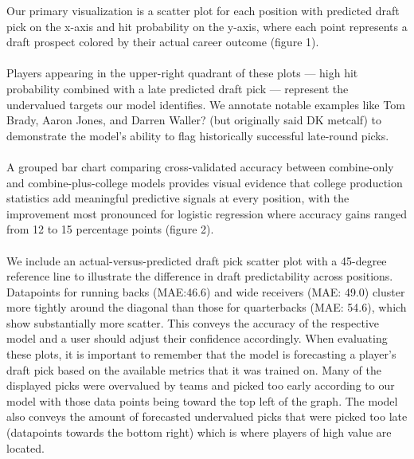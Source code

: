 \documentclass[11pt]{article}
\begin{document}
Our primary visualization is a scatter plot for each position with predicted draft pick on the x-axis and hit probability on the y-axis, where each point represents a draft prospect colored by their actual career outcome (figure 1). \\
\\
Players appearing in the upper-right quadrant of these plots — high hit probability combined with a late predicted draft pick — represent the undervalued targets our model identifies. We annotate notable examples like Tom Brady, Aaron Jones, and Darren Waller? (but originally said DK metcalf) to demonstrate the model's ability to flag historically successful late-round picks. \\
\\
A grouped bar chart comparing cross-validated accuracy between combine-only and combine-plus-college models provides visual evidence that college production statistics add meaningful predictive signals at every position, with the improvement most pronounced for logistic regression where accuracy gains ranged from 12 to 15 percentage points (figure 2). \\
\\
We include an actual-versus-predicted draft pick scatter plot with a 45-degree reference line to illustrate the difference in draft predictability across positions. Datapoints for running backs (MAE:46.6) and wide receivers (MAE: 49.0) cluster more tightly around the diagonal than those for quarterbacks (MAE: 54.6), which show substantially more scatter. This conveys the accuracy of the respective model and a user should adjust their confidence accordingly. When evaluating these plots, it is important to remember that the model is forecasting a player's draft pick based on the available metrics that it was trained on. Many of the displayed picks were overvalued by teams and picked too early according to our model with those data points being toward the top left of the graph. The model also conveys the amount of forecasted undervalued picks that were picked too late (datapoints towards the bottom right) which is where players of high value are located.\\
\\
\end{document}
